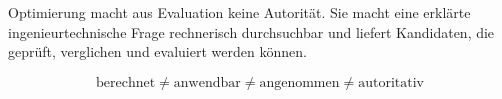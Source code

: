\begin{summary}
Optimierung macht aus Evaluation keine Autorität. Sie macht eine erklärte
ingenieurtechnische Frage rechnerisch durchsuchbar und liefert Kandidaten, die
geprüft, verglichen und evaluiert werden können.

\[
\boxed{\text{berechnet}\neq\text{anwendbar}\neq
\text{angenommen}\neq\text{autoritativ}}
\]
\end{summary}
